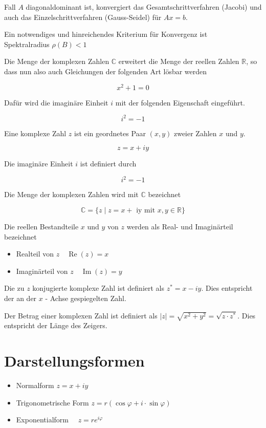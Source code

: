 \documentclass[10pt]{article}
\begin{document}
Fall $A$ diagonaldominant ist, konvergiert das Gesamtschrittverfahren (Jacobi) und auch das Einzelschrittverfahren (Gauss-Seidel) für $A x=b$.

Ein notwendiges und hinreichendes Kriterium für Konvergenz ist\\
Spektralradius $\rho(B)<1$

Die Menge der komplexen Zahlen $\mathbb{C}$ erweitert die Menge der reellen Zahlen $\mathbb{R}$, so dass nun also auch Gleichungen der folgenden Art lösbar werden

$$
x^{2}+1=0
$$

Dafür wird die imaginäre Einheit $i$ mit der folgenden Eigenschaft eingeführt.

$$
i^{2}=-1
$$

Eine komplexe Zahl $z$ ist ein geordnetes Paar $(x, y)$ zweier Zahlen $x$ und $y$.

$$
z=x+i y
$$

Die imaginäre Einheit $i$ ist definiert durch

$$
i^{2}=-1
$$

Die Menge der komplexen Zahlen wird mit $\mathbb{C}$ bezeichnet

$$
\mathbb{C}=\{z \mid z=x+\text { iy mit } x, y \in \mathbb{R}\}
$$

Die reellen Bestandteile $x$ und $y$ von $z$ werden als Real- und Imaginärteil bezeichnet

\begin{itemize}
  \item Realteil von $z \quad \operatorname{Re}(z)=x$
  \item Imaginärteil von $z \quad \operatorname{Im}(z)=y$
\end{itemize}

Die zu $z$ konjugierte komplexe Zahl ist definiert als $z^{*}=x-i y$. Dies entspricht der an der $x$ - Achse gespiegelten Zahl.

Der Betrag einer komplexen Zahl ist definiert als $|z|=\sqrt{x^{2}+y^{2}}=\sqrt{z \cdot z^{*}}$. Dies entspricht der Länge des Zeigers.

\section*{Darstellungsformen}
\begin{itemize}
  \item Normalform $z=x+i y$
  \item Trigonometrische Form $z=r(\cos \varphi+i \cdot \sin \varphi)$
  \item Exponentialform $\quad z=r e^{i \varphi}$
\end{itemize}
\end{document}
